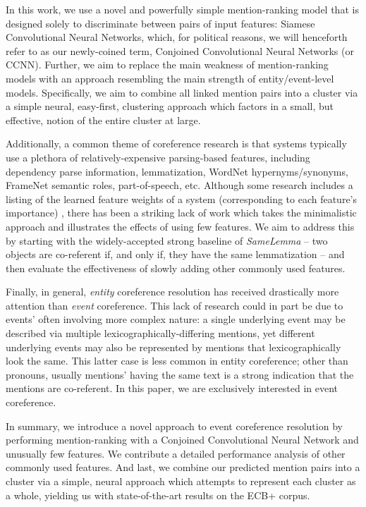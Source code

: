 \documentclass[11pt,a4paper]{article}
\begin{document}
In this work, we use a novel and powerfully simple mention-ranking model that is designed solely to discriminate between pairs of input features: Siamese Convolutional Neural Networks, which, for political reasons, we will henceforth refer to as our newly-coined term, Conjoined Convolutional Neural Networks (or CCNN).  Further, we aim to replace the main weakness of mention-ranking models with an approach resembling the main strength of entity/event-level models.  Specifically, we aim to combine all linked mention pairs into a cluster via a simple neural, easy-first, clustering approach which factors in a small, but effective, notion of the entire cluster at large.


Additionally, a common theme of coreference research is that systems typically use a plethora of relatively-expensive parsing-based features, including dependency parse information, lemmatization, WordNet hypernyms/synonyms, FrameNet semantic roles, part-of-speech, etc.  Although some research includes a listing of the learned feature weights of a system (corresponding to each feature's importance) \cite{journals/tacl/YangCF15}, there has been a striking lack of work which takes the minimalistic approach and illustrates the effects of using few features.  We aim to address this by starting with the widely-accepted strong baseline of \textit{SameLemma} -- two objects are co-referent if, and only if, they have the same lemmatization -- and then evaluate the effectiveness of slowly adding other commonly used features.

Finally, in general, \textit{entity} coreference resolution has received drastically more attention than \textit{event} coreference.  This lack of research could in part be due to events' often involving more complex nature: a single underlying event may be described via multiple lexicographically-differing mentions, yet different underlying events may also be represented by mentions that lexicographically look the same.  This latter case is less common in entity coreference; other than pronouns, usually mentions' having the same text is a strong indication that the mentions are co-referent.  In this paper, we are exclusively interested in event coreference.

In summary, we introduce a novel approach to event coreference resolution by performing mention-ranking with a Conjoined Convolutional Neural Network and unusually few features.  We contribute a detailed performance analysis of other commonly used features.  And last, we combine our predicted mention pairs into a cluster via a simple, neural approach which attempts to represent each cluster as a whole, yielding us with state-of-the-art results on the ECB+ corpus.
\end{document}
